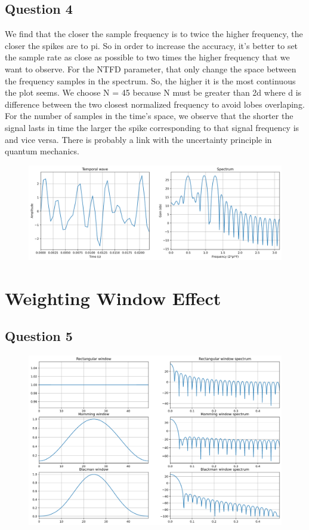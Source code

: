 \documentclass[]{article}
\begin{document}
\subsection*{Question 4}

We find that the closer the sample frequency is to twice the higher frequency, the closer the spikes are to pi.
So in order to increase the accuracy, it's better to set the sample rate as close as possible
to two times the higher frequency that we want to observe. 
For the NTFD parameter, that only change the space between the frequency samples in the spectrum.
So, the higher it is the most continuous the plot seems. 
We choose N = 45 because N must be greater than 2d where d is difference between the two closest normalized frequency to avoid lobes overlaping.
For the number of samples in the time's space, we observe that the shorter the signal lasts in time the larger the spike corresponding to
that signal frequency is and vice versa. There is probably a link with the uncertainty principle in quantum mechanics.

\begin{figure}[H]
    \centering
    \includegraphics[scale=0.25]{q4.png}
\end{figure}


\section{Weighting Window Effect}
\subsection*{Question 5}

\begin{figure}[H]
    \centering
\includegraphics[scale=0.25]{q5.png}
\end{figure}
\end{document}
